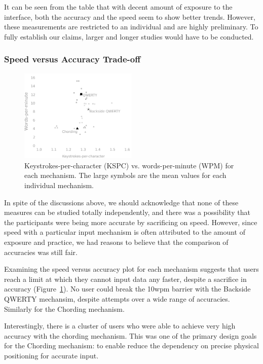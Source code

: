 It can be seen from the table that with decent amount of exposure to
the interface, both the accuracy and the speed seem to show better
trends. However, these measurements are restricted to an individual
and are highly preliminary. To fully establish our claims, larger and
longer studies would have to be conducted.

\subsubsection{Speed versus Accuracy Trade-off}

\begin{figure}
    \includegraphics[width=0.5\textwidth]{Figures/kspc_vs_wpm.pdf} 
    \caption{Keystrokes-per-character (KSPC) vs. words-per-minute
      (WPM) for each mechanism.  The large symbols are the mean values
      for each individual mechanism. }
    \label{fig:kspc_vs_wpm}
\end{figure}

In spite of the discussions above, we should acknowledge that none of
these measures can be studied totally independently, and there was a
possibility that the participants were being more accurate by
sacrificing on speed. However, since speed with a particular input
mechanism is often attributed to the amount of exposure and practice,
we had reasons to believe that the comparison of accuracies was still
fair. 

Examining the speed versus accuracy plot for each mechanism suggests
that users reach a limit at which they cannot input data any faster,
despite a sacrifice in accuracy (Figure~\ref{fig:kspc_vs_wpm}).  No
user could break the 10wpm barrier with the Backside QWERTY mechansim,
despite attempts over a wide range of accuracies.  Similarly for the
Chording mechanism.

Interestingly, there is a cluster of users who were able to achieve
very high accuracy with the chording mechanism.  This was one of the
primary design goals for the Chording mechanism: to enable reduce the
dependency on precise physical positioning for accurate input.

